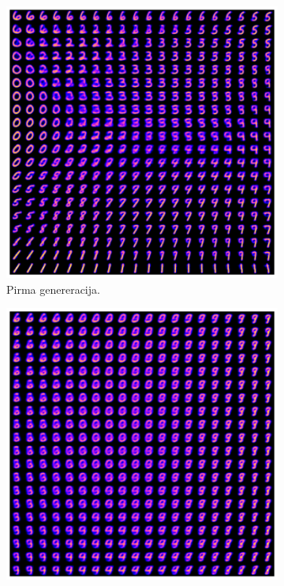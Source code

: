 \documentclass{VUMIFInfKursinis}
\begin{document}
\begin{figure}[H]
    \centering
    \begin{subfigure}[t]{0.45\textwidth} %
        \centering
        \includegraphics[scale=0.40]{img/synthetic_generation_1.png}
        \caption{Pirma genereracija.}
        \label{img:image1}
    \end{subfigure}
    \hfill %
    \begin{subfigure}[t]{0.45\textwidth} %
        \centering
        \includegraphics[scale=0.40]{img/synthetic_generation_2.png}

\end{subfigure}
\end{figure}
\end{document}
